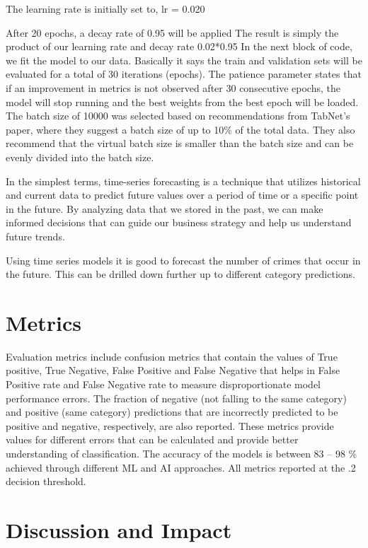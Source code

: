 \documentclass[conference,final,]{IEEEtran}
\begin{document}
The learning rate is initially set to, lr = 0.020

After 20 epochs, a decay rate of 0.95 will be applied The result is
simply the product of our learning rate and decay rate 0.02*0.95 In the
next block of code, we fit the model to our data. Basically it says the
train and validation sets will be evaluated for a total of 30 iterations
(epochs). The patience parameter states that if an improvement in
metrics is not observed after 30 consecutive epochs, the model will stop
running and the best weights from the best epoch will be loaded. The
batch size of 10000 was selected based on recommendations from TabNet's
paper, where they suggest a batch size of up to 10\% of the total data.
They also recommend that the virtual batch size is smaller than the
batch size and can be evenly divided into the batch size.

In the simplest terms, time-series forecasting is a technique that
utilizes historical and current data to predict future values over a
period of time or a specific point in the future. By analyzing data that
we stored in the past, we can make informed decisions that can guide our
business strategy and help us understand future trends.

Using time series models it is good to forecast the number of crimes
that occur in the future. This can be drilled down further up to
different category predictions.

\section{Metrics}\label{metrics}

Evaluation metrics include confusion metrics that contain the values of
True positive, True Negative, False Positive and False Negative that
helps in False Positive rate and False Negative rate to measure
disproportionate model performance errors. The fraction of negative (not
falling to the same category) and positive (same category) predictions
that are incorrectly predicted to be positive and negative,
respectively, are also reported. These metrics provide values for
different errors that can be calculated and provide better understanding
of classification. The accuracy of the models is between 83 -- 98 \%
achieved through different ML and AI approaches. All metrics reported at
the .2 decision threshold.

\section{Discussion and Impact}\label{discussion-and-impact}
\end{document}
